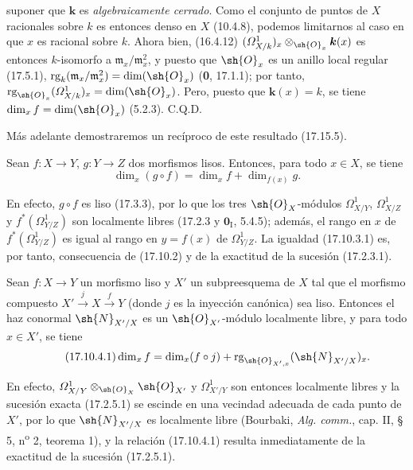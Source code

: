 
suponer que $\boldsymbol k$ es \emph{algebraicamente cerrado}. Como el conjunto de puntos de $X$ racionales sobre $k$ es entonces denso en $X$ (10.4.8), podemos limitarnos al caso en que $x$ es racional sobre $k$. Ahora bien, (16.4.12) $(\varOmega^1_{X/k})_x\otimes_{\sh{O}_x}\boldsymbol k(x)$ es entonces $k$-isomorfo a $\mathfrak m_x/\mathfrak m_x^2$, y puesto que $\sh{O}_x$ es un anillo local regular (17.5.1), $\operatorname{rg}_k(\mathfrak m_x/\mathfrak m_x^2)=\dim(\sh{O}_x)$ (\textbf 0, 17.1.1); por tanto, $\operatorname{rg}_{\sh{O}_x}(\varOmega^1_{X/k})_x=\dim(\sh{O}_x)$. Pero, puesto que $\boldsymbol k(x)=k$, se tiene $\dim_x f=\dim(\sh{O}_x)$ (5.2.3). C.Q.D.

Más adelante demostraremos un recíproco de este resultado (17.15.5).

\begin{corollary}[17.10.3]
\label{IV.17.10.3}
Sean $f:X\to Y$, $g:Y\to Z$ dos morfismos lisos. Entonces, para todo $x\in X$, se tiene
\begin{equation}
\label{IV.17.10.3.1}
\tag{17.10.3.1}
\dim_x(g\circ f)=\dim_x f+\dim_{f(x)}g.
\end{equation}
\end{corollary}

En efecto, $g\circ f$ es liso (17.3.3), por lo que los tres $\sh{O}_X$-módulos $\varOmega^1_{X/Y}$, $\varOmega^1_{X/Z}$ y $f^*(\varOmega^1_{Y/Z})$ son localmente libres (17.2.3 y $\mathbf{0}_{\mathrm I}$, 5.4.5); además, el rango en $x$ de $f^*(\varOmega^1_{Y/Z})$ es igual al rango en $y=f(x)$ de $\varOmega^1_{Y/Z}$. La igualdad (17.10.3.1) es, por tanto, consecuencia de (17.10.2) y de la exactitud de la sucesión (17.2.3.1).

\begin{corollary}[17.10.4]
\label{IV.17.10.4}
Sean $f:X\to Y$ un morfismo liso y $X'$ un subpreesquema de $X$ tal que el morfismo compuesto $X'\xrightarrow{j}X\xrightarrow{f}Y$ (donde $j$ es la inyección canónica) sea liso. Entonces el haz conormal $\sh{N}_{X'/X}$ es un $\sh{O}_{X'}$-módulo localmente libre, y para todo $x\in X'$, se tiene
\begin{equation}
\label{IV.17.10.4.1}
\tag{17.10.4.1}
\dim_x f=\dim_x(f\circ j)+\operatorname{rg}_{\sh{O}_{X',x}}(\sh{N}_{X'/X})_x.
\end{equation}
\end{corollary}

En efecto, $\varOmega^1_{X/Y}\otimes_{\sh{O}_X}\sh{O}_{X'}$ y $\varOmega^1_{X'/Y}$ son entonces localmente libres y la sucesión exacta (17.2.5.1) se escinde en una vecindad adecuada de cada punto de $X'$, por lo que $\sh{N}_{X'/X}$ es localmente libre (Bourbaki, \emph{Alg. comm.}, cap. II, § 5, n\textsuperscript{o} 2, teorema 1), y la relación (17.10.4.1) resulta inmediatamente de la exactitud de la sucesión (17.2.5.1).
